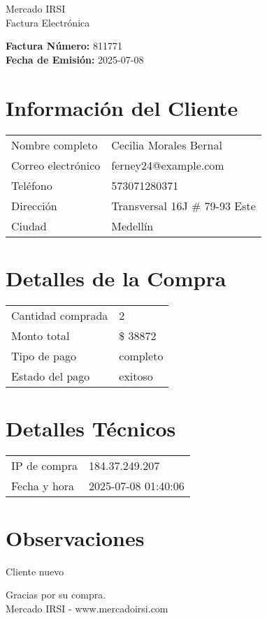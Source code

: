 \documentclass[12pt]{article}
\begin{document}
\begin{center}
    \Huge Mercado IRSI \\
    \Large Factura Electrónica
\end{center}

\vspace{0.5cm}

\noindent \textbf{Factura Número:} 811771 \\
\textbf{Fecha de Emisión:} 2025-07-08

\vspace{0.5cm}

\section*{Información del Cliente}
\begin{longtable}{ll}
Nombre completo & Cecilia Morales Bernal \\
Correo electrónico & ferney24@example.com \\
Teléfono & 573071280371 \\
Dirección & Transversal 16J \# 79-93 Este \\
Ciudad & Medellín \\
\end{longtable}

\vspace{0.5cm}

\section*{Detalles de la Compra}
\begin{longtable}{ll}
Cantidad comprada & 2 \\
Monto total & \$ 38872 \\
Tipo de pago & completo \\
Estado del pago & exitoso \\
\end{longtable}

\vspace{0.5cm}

\section*{Detalles Técnicos}
\begin{longtable}{ll}
IP de compra & 184.37.249.207 \\
Fecha y hora & 2025-07-08 01:40:06 \\
\end{longtable}

\vspace{0.5cm}

\section*{Observaciones}
Cliente nuevo

\vspace{0.5cm}

\begin{center}
    Gracias por su compra. \\
    Mercado IRSI - www.mercadoirsi.com
\end{center}
\end{document}
